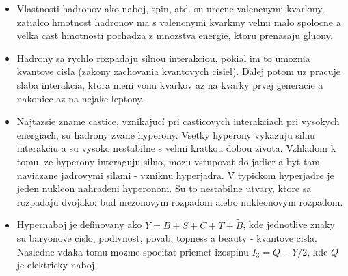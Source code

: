 \documentclass[../../main.tex]{subfiles}
\begin{document}
\begin{itemize}
	\item Vlastnosti hadronov ako naboj, spin, atd. su urcene valencnymi kvarkmy, zatialco hmotnost hadronov ma s valencnymi kvarkmy velmi malo spolocne a velka cast hmotnosti pochadza z mnozstva energie, ktoru prenasaju gluony.
	\item Hadrony sa rychlo rozpadaju silnou interakciou, pokial im to umoznia kvantove cisla (zakony zachovania kvantovych cisiel). Dalej potom uz pracuje slaba interakcia, ktora meni vonu kvarkov az na kvarky prvej generacie a nakoniec az na nejake leptony.
	\item Najtazsie zname castice, vznikajucí pri casticovych interakciach pri vysokych energiach, su hadrony zvane hyperony. Vsetky hyperony vykazuju silnu interakciu a su vysoko nestabilne s velmi kratkou dobou zivota. Vzhladom k tomu, ze hyperony interaguju silno, mozu vstupovat do jadier a byt tam naviazane jadrovymi silami - vzniknu hyperjadra. V typickom hyperjadre je jeden nukleon nahradeni hyperonom. Su to nestabilne utvary, ktore sa rozpadaju dvojako: bud mezonovym rozpadom alebo nukleonovym rozpadom.
	\item Hypernaboj je definovany ako $Y=B+S+C+T+\tilde{B}$, kde jednotlive znaky su baryonove cislo, podivnost, povab, topness a beauty - kvantove cisla. Nasledne vdaka tomu mozme spocitat priemet izospinu $I_3=Q-Y/2$, kde $Q$ je elektricky naboj.
\end{itemize}
\end{document}

